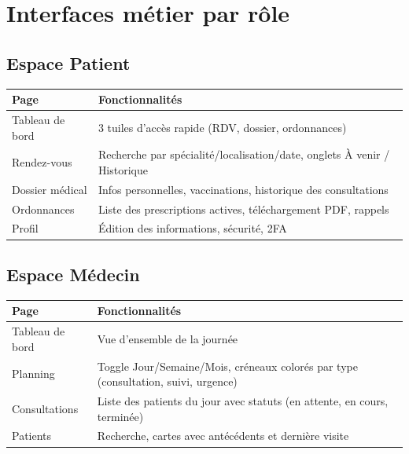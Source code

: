 \documentclass[11pt,a4paper]{article}
\begin{document}
\newpage

\section{Interfaces métier par rôle}

\subsection{Espace Patient}

\begin{table}[H]
\centering
\renewcommand{\arraystretch}{1.4}
\begin{tabularx}{\textwidth}{lX}
\toprule
\rowcolor{primary!10}
\textbf{Page} & \textbf{Fonctionnalités} \\
\midrule
Tableau de bord & 3 tuiles d'accès rapide (RDV, dossier, ordonnances) \\
Rendez-vous & Recherche par spécialité/localisation/date, onglets À venir / Historique \\
Dossier médical & Infos personnelles, vaccinations, historique des consultations \\
Ordonnances & Liste des prescriptions actives, téléchargement PDF, rappels \\
Profil & Édition des informations, sécurité, 2FA \\
\bottomrule
\end{tabularx}
\end{table}

\subsection{Espace Médecin}

\begin{table}[H]
\centering
\renewcommand{\arraystretch}{1.4}
\begin{tabularx}{\textwidth}{lX}
\toprule
\rowcolor{primary!10}
\textbf{Page} & \textbf{Fonctionnalités} \\
\midrule
Tableau de bord & Vue d'ensemble de la journée \\
Planning & Toggle Jour/Semaine/Mois, créneaux colorés par type (consultation, suivi, urgence) \\
Consultations & Liste des patients du jour avec statuts (en attente, en cours, terminée) \\
Patients & Recherche, cartes avec antécédents et dernière visite \\
\bottomrule
\end{tabularx}
\end{table}
\end{document}
